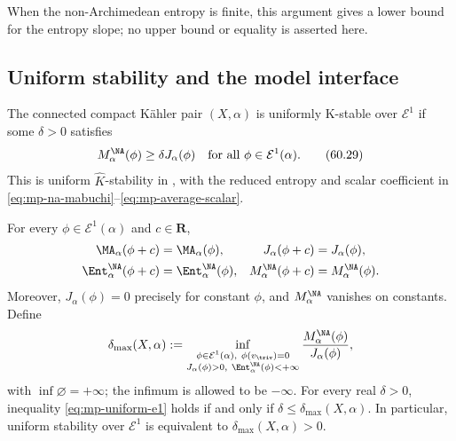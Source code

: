 When the non-Archimedean entropy is finite, this argument gives a lower bound for the entropy slope; no upper bound or equality is asserted here.


\subsection{Uniform stability and the model interface}
\label{subsec:mp-psh-uniform-stability}

\begin{definition}\label{def:mp-uniform-e1-stability}
The connected compact K\"ahler pair $(X,\alpha)$ is uniformly K-stable over $\mathcal E^1$ if some $\delta>0$ satisfies
\[
            M_\alpha^{\NA}(\phi)\geq\delta J_\alpha(\phi)
       \quad\text{for all }\phi\in\mathcal E^1(\alpha).
\tag{60.29}\label{eq:mp-uniform-e1}
\]
This is uniform $\widehat K$-stability in \cite[Definition~2.4.2, p.~13]{MPWN25}, with the reduced entropy and scalar coefficient in \eqref{eq:mp-na-mabuchi}--\eqref{eq:mp-average-scalar}.
\end{definition}

\begin{samepage}
\begin{proposition}\label{prop:mp-stability-normalized-tests}
For every $\phi\in\mathcal E^1(\alpha)$ and $c\in\mathbf R$,
\[
 \begin{aligned}
 \MA_\alpha(\phi+c)&=\MA_\alpha(\phi),&
 J_\alpha(\phi+c)&=J_\alpha(\phi),\\
 \Ent_\alpha^{\NA}(\phi+c)&=\Ent_\alpha^{\NA}(\phi),&
 M_\alpha^{\NA}(\phi+c)&=M_\alpha^{\NA}(\phi).
 \end{aligned}
\]
Moreover, $J_\alpha(\phi)=0$ precisely for constant $\phi$, and $M_\alpha^{\NA}$ vanishes on constants. Define
\[
 \delta_{\max}(X,\alpha):=
 \inf_{\substack{\phi\in\mathcal E^1(\alpha),\ \phi(v_{\triv})=0\\
              J_\alpha(\phi)>0,\ \Ent_\alpha^{\NA}(\phi)<+\infty}}
          \frac{M_\alpha^{\NA}(\phi)}{J_\alpha(\phi)},
\]
with $\inf\varnothing=+\infty$; the infimum is allowed to be $-\infty$. For every real $\delta>0$, inequality \eqref{eq:mp-uniform-e1} holds if and only if $\delta\leq\delta_{\max}(X,\alpha)$. In particular, uniform stability over $\mathcal E^1$ is equivalent to $\delta_{\max}(X,\alpha)>0$.
\end{proposition}
\end{samepage}

